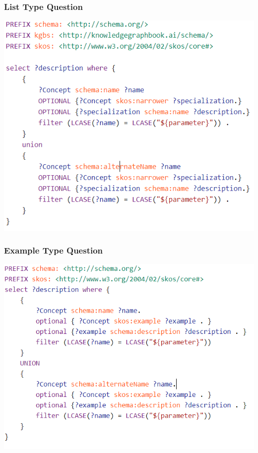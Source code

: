 \documentclass{beamer}
\begin{document}
\begin{frame}
\frametitle{List Type Question}
\begin{center}
\includegraphics[scale=0.5]{pictures/list_type_query.png}
\end{center}
\end{frame}

\begin{frame}
\frametitle{Example Type Question}
\begin{center}
\includegraphics[scale=0.5]{pictures/example_type_query.png}
\end{center}
\end{frame}
\end{document}
